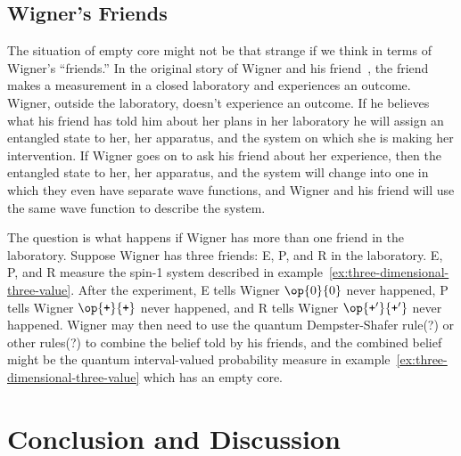 \documentclass[12pt]{iopart}
\theoremstyle{plain}
\theoremstyle{definition}
\theoremstyle{remark}
\newcommand{\proj}[1]{\op{#1}{#1}}
\newcommand{\ps}{\texttt{+}}
\begin{document}


\subsection{Wigner's Friends}

The situation of empty core might not be that strange if we think
in terms of Wigner's ``friends.'' In the original story of Wigner
and his friend~\cite{Wigner1961,FuchsMerminSchack2014}, the friend
makes a measurement in a closed laboratory and experiences an outcome.
Wigner, outside the laboratory, doesn't experience an outcome. If
he believes what his friend has told him about her plans in her laboratory
he will assign an entangled state to her, her apparatus, and the system
on which she is making her intervention. If Wigner goes on to ask
his friend about her experience, then the entangled state to her,
her apparatus, and the system will change into one in which they even
have separate wave functions, and Wigner and his friend will use the
same wave function to describe the system.

The question is what happens if Wigner has more than one friend in
the laboratory. Suppose Wigner has three friends: E, P, and R in the
laboratory. E, P, and R measure the spin-1 system described in example~\ref{ex:three-dimensional-three-value}.
After the experiment, E tells Wigner $\proj{0}$ never happened, P
tells Wigner $\proj{\ps}$ never happened, and R tells Wigner $\proj{\ps'}$
never happened. Wigner may then need to use the quantum Dempster-Shafer
rule(?) or other rules(?) to combine the belief told by his friends,
and the combined belief might be the quantum interval-valued probability
measure in example~\ref{ex:three-dimensional-three-value} which
has an empty core.

\section{Conclusion and Discussion}
\end{document}
